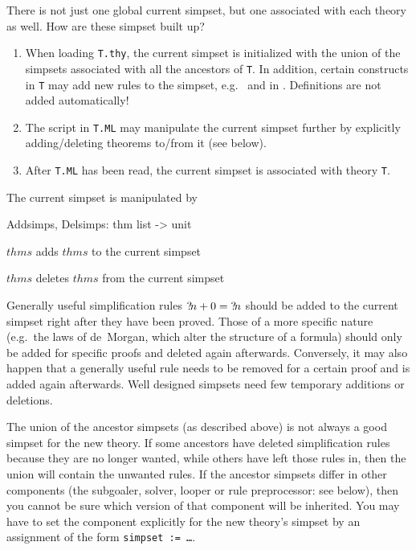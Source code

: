 There is not just one global current simpset, but one associated with each
theory as well.  How are these simpset built up?
\begin{enumerate}
\item When loading {\tt T.thy}, the current simpset is initialized with the
  union of the simpsets associated with all the ancestors of {\tt T}.  In
  addition, certain constructs in {\tt T} may add new rules to the simpset,
  e.g.\  and  in \HOL.  Definitions are not
  added automatically!
\item The script in {\tt T.ML} may manipulate the current simpset further by
  explicitly adding/deleting theorems to/from it (see below).
\item After {\tt T.ML} has been read, the current simpset is associated with
  theory {\tt T}.
\end{enumerate}
The current simpset is manipulated by
\begin{ttbox}
Addsimps, Delsimps: thm list -> unit
\end{ttbox}
\begin{ttdescription}
\item[\ttindexbold{Addsimps} $thms$] adds $thms$ to the current simpset
\item[\ttindexbold{Delsimps} $thms$] deletes $thms$ from the current simpset
\end{ttdescription}

Generally useful simplification rules ${?\!n}+0 = {?\!n}$ should be added
to the current simpset right after they have been proved.  Those of a more
specific nature (e.g.\ the laws of de~Morgan, which alter the structure of a
formula) should only be added for specific proofs and deleted again
afterwards.  Conversely, it may also happen that a generally useful rule needs
to be removed for a certain proof and is added again afterwards.  Well
designed simpsets need few temporary additions or deletions.

\begin{warn}
  The union of the ancestor simpsets (as described above) is not always a good
  simpset for the new theory.  If some ancestors have deleted simplification
  rules because they are no longer wanted, while others have left those rules
  in, then the union will contain the unwanted rules.  If the ancestor
  simpsets differ in other components (the subgoaler, solver, looper or rule
  preprocessor: see below), then you cannot be sure which version of that
  component will be inherited.  You may have to set the component explicitly
  for the new theory's simpset by an assignment of the form
 {\tt simpset := \dots}.
\end{warn}

